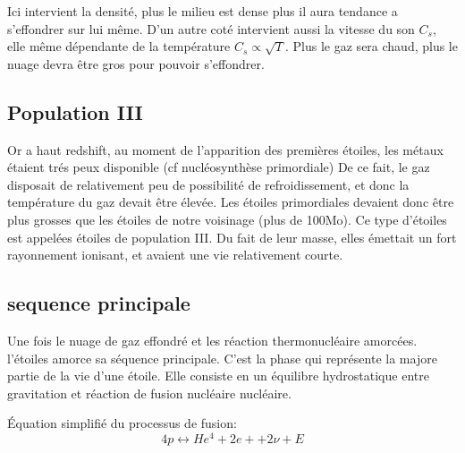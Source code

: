 Ici intervient la densité, plus le milieu est dense plus il aura tendance a s'effondrer sur lui même.
D'un autre coté intervient aussi la vitesse du son $C_s$, elle même dépendante de la température $C_s \propto \sqrt{T}$.
Plus le gaz sera chaud, plus le nuage devra être gros pour pouvoir s’effondrer.



\subsection{Population III}


Or a haut redshift, au moment de l'apparition des premières étoiles, les métaux étaient trés peux disponible (cf nucléosynthèse primordiale) %
De ce fait, le gaz disposait de relativement peu de possibilité de refroidissement, et donc la température du gaz devait être élevée.
Les étoiles primordiales devaient donc être plus grosses que les étoiles de notre voisinage (plus de 100Mo).
Ce type d'étoiles est appelées étoiles de population III.
Du fait de leur masse, elles émettait un fort rayonnement ionisant, et avaient une vie relativement courte.



%



\subsection{sequence principale}



Une fois le nuage de gaz effondré et les réaction thermonucléaire amorcées.
l'étoiles amorce sa séquence principale.
C'est la phase qui représente la majore partie de la vie d'une étoile.
Elle consiste en un équilibre hydrostatique entre gravitation et réaction de fusion nucléaire nucléaire.

Équation simplifié du processus de fusion:
\begin{equation}
4p \leftrightarrow He^4 + 2e+ + 2\nu + E
\end{equation}

